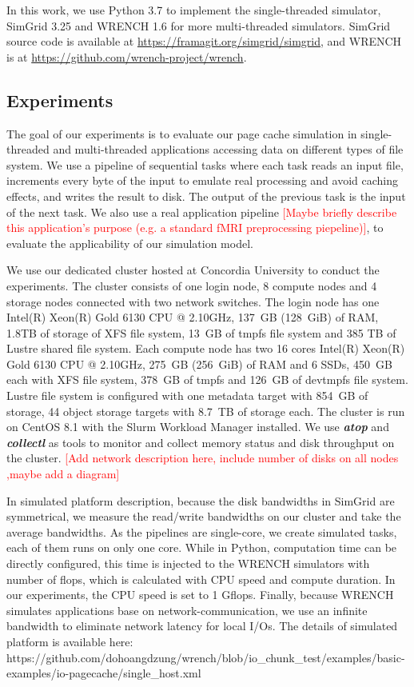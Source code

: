 \documentclass[conference]{IEEEtran}
\begin{document}
			In this work, we use Python 3.7 to implement the single-threaded simulator, 
			SimGrid 3.25 and WRENCH 1.6 for more multi-threaded simulators. 
			SimGrid source code is available at \url{https://framagit.org/simgrid/simgrid}, 
			and WRENCH is at \url{https://github.com/wrench-project/wrench}.
			
		\subsection{Experiments}
		
        	The goal of our experiments is to evaluate our page cache 
			simulation in single-threaded and multi-threaded applications
			accessing data on different types of file system. We use a pipeline
			of sequential tasks where each task reads an input file, increments
			every byte of the input to emulate real processing and avoid caching
			effects, and writes the result to disk. The output of the previous
			task is the input of the next task. We also use a real application 
            pipeline \textcolor{red}{[Maybe briefly describe this application's purpose (e.g. a standard fMRI preprocessing piepeline)]}, to evaluate the applicability of our simulation model. 
			
			We use our dedicated cluster hosted at Concordia University to conduct 
			the experiments. The cluster consists of one login node, 8 compute nodes 
			and 4 storage nodes connected with two network switches. The login node 
			has one Intel(R) Xeon(R) Gold 6130 CPU @ 2.10GHz, 137~GB (128~GiB) of RAM, 
			1.8TB of storage of XFS file system, 13~GB of tmpfs file system and 385 TB of 
			Lustre shared file system. Each compute node has two 16 cores Intel(R) 
			Xeon(R) Gold 6130 CPU @ 2.10GHz, 275~GB (256~GiB) of RAM and 6 SSDs, 
			450~GB each with XFS file system, 378~GB of tmpfs and 126~GB of devtmpfs file system.
			Lustre file system is configured with one metadata target with 854~GB 
			of storage, 44 object storage targets with 8.7~TB of storage each. 
			The cluster is run on CentOS 8.1 with the Slurm Workload Manager installed. 
			We use \textbf{\textit{atop}} and \textbf{\textit{collectl}} as tools to 
			monitor and collect memory status and disk throughput 
			on the cluster. 
			\textcolor{red}{[Add network description here, include number of disks 
			on all nodes ,maybe add a diagram]}
			
			In simulated platform description, because the disk bandwidths in SimGrid 
			are symmetrical, we measure the read/write bandwidths on our cluster and 
			take the average bandwidths. 
			As the pipelines are single-core, we create simulated tasks, 
			each of them runs on only one core. 
			While in Python, computation time can be directly configured, 
			this time is injected to the WRENCH simulators with number of flops, 
			which is calculated with CPU speed and compute duration. 
			In our experiments, the CPU speed is set to 1 Gflops. 
			Finally, because WRENCH simulates applications base on network-communication, 
			we use an infinite bandwidth to eliminate network latency for local I/Os.
			The details of simulated platform is available here: 
			https://github.com/dohoangdzung/wrench/blob/io_chunk_test/examples/basic-examples/io-pagecache/single_host.xml
			
\end{document}
